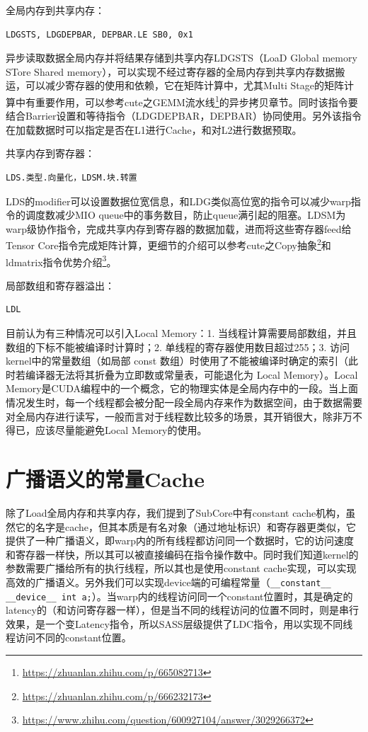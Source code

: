 全局内存到共享内存：

\begin{lstlisting}
LDGSTS, LDGDEPBAR, DEPBAR.LE SB0, 0x1
\end{lstlisting}

异步读取数据全局内存并将结果存储到共享内存LDGSTS（LoaD Global memory STore Shared memory），可以实现不经过寄存器的全局内存到共享内存数据搬运，可以减少寄存器的使用和依赖，它在矩阵计算中，尤其Multi Stage的矩阵计算中有重要作用，可以参考cute之GEMM流水线\footnote{\url{https://zhuanlan.zhihu.com/p/665082713}}的异步拷贝章节。同时该指令要结合Barrier设置和等待指令（LDGDEPBAR，DEPBAR）协同使用。另外该指令在加载数据时可以指定是否在L1进行Cache，和对L2进行数据预取。

共享内存到寄存器：

\begin{lstlisting}
LDS.类型.向量化，LDSM.块.转置
\end{lstlisting}

LDS的modifier可以设置数据位宽信息，和LDG类似高位宽的指令可以减少warp指令的调度数减少MIO queue中的事务数目，防止queue满引起的阻塞。LDSM为warp级协作指令，完成共享内存到寄存器的数据加载，进而将这些寄存器feed给Tensor Core指令完成矩阵计算，更细节的介绍可以参考cute之Copy抽象\footnote{\url{https://zhuanlan.zhihu.com/p/666232173}}和ldmatrix指令优势介绍\footnote{\url{https://www.zhihu.com/question/600927104/answer/3029266372}}。

局部数组和寄存器溢出：

\begin{lstlisting}
LDL
\end{lstlisting}

目前认为有三种情况可以引入Local Memory：1. 当线程计算需要局部数组，并且数组的下标不能被编译时计算时；2. 单线程的寄存器使用数目超过255；3. 访问kernel中的常量数组（如局部 const 数组）时使用了不能被编译时确定的索引（此时若编译器无法将其折叠为立即数或常量表，可能退化为 Local Memory）。Local Memory是CUDA编程中的一个概念，它的物理实体是全局内存中的一段。当上面情况发生时，每一个线程都会被分配一段全局内存来作为数据空间，由于数据需要对全局内存进行读写，一般而言对于线程数比较多的场景，其开销很大，除非万不得已，应该尽量能避免Local  Memory的使用。

\section{广播语义的常量Cache}

除了Load全局内存和共享内存，我们提到了SubCore中有constant cache机构，虽然它的名字是cache，但其本质是有名对象（通过地址标识）和寄存器更类似，它提供了一种广播语义，即warp内的所有线程都访问同一个数据时，它的访问速度和寄存器一样快，所以其可以被直接编码在指令操作数中。同时我们知道kernel的参数需要广播给所有的执行线程，所以其也是使用constant cache实现，可以实现高效的广播语义。另外我们可以实现device端的可编程常量（\lstinline|__constant__ __device__ int a;|）。当warp内的线程访问同一个constant位置时，其是确定的latency的（和访问寄存器一样），但是当不同的线程访问的位置不同时，则是串行效果，是一个变Latency指令，所以SASS层级提供了LDC指令，用以实现不同线程访问不同的constant位置。

